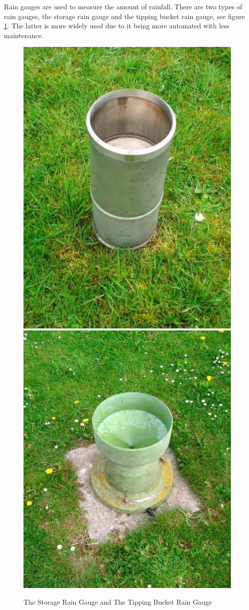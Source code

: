 Rain gauges are used to measure the amount of rainfall. There are two types of rain gauges, the storage rain gauge and the tipping bucket rain gauge, see figure \ref{Gauge}. The latter is more widely used due to it being more automated with less maintenance.\cite{RainGauge}

\begin{figure}[h]
\centering
\includegraphics[scale=0.2]{img/storageRainGauge.jpg}
\includegraphics[scale=0.2]{img/tippingBucketGauge.jpg}
\caption{The Storage Rain Gauge and The Tipping Bucket Rain Gauge}
\label{Gauge}
\end{figure}

